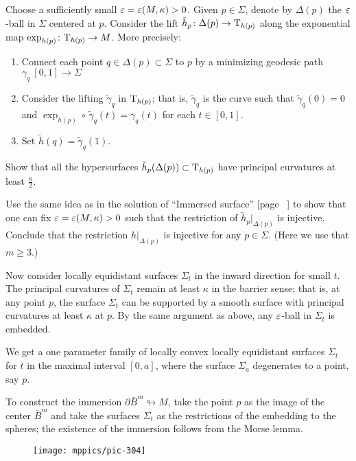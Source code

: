 Choose a sufficiently small $\varepsilon=\varepsilon(M,\kappa)>0$.
Given $p\in \Sigma$, denote by $\Delta(p)$ the $\varepsilon$-ball in $\Sigma$ centered at $p$.
Consider the lift $\tilde h_p\colon\Delta(p)\to \mathrm{T}_{h(p)}$ along the exponential map $\exp_{h(p)}\colon\mathrm{T}_{h(p)}\to M$.
More precisely:
\begin{enumerate}
\item Connect each point $q\in \Delta(p)\subset \Sigma$ to $p$
by a minimizing geodesic  path $\gamma_q\:[0,1]\to \Sigma$
\item Consider the lifting $\tilde\gamma_q$ in $\mathrm{T}_{h(p)}$; 
that is, $\tilde\gamma_q$ is the curve such that $\tilde\gamma_q(0)=0$ 
and $\exp_{h(p)}\circ\,\tilde\gamma_q(t)=\gamma_q(t)$ for each $t\in[0,1]$.
 \item Set $\tilde h(q)=\tilde\gamma_q(1)$.
\end{enumerate}

Show that all the hypersurfaces $\tilde h_p(\Delta(p))\subset \mathrm{T}_{h(p)}$ have principal curvatures at least $\tfrac\kappa2$.

Use the same idea as in the solution of ``Immersed surface'' [page ~\pageref{Immersed surface}] to show that 
one can fix $\eps\z=\eps(M,\kappa)>0$ such that the restriction of $\tilde h_p|_{\Delta(p)}$ is injective.
Conclude that the restriction $h|_{\Delta(p)}$ is injective for any $p\in\Sigma$.
(Here we use that $m\ge 3$.)

Now consider locally equidistant surfaces $\Sigma_t$ in the inward direction for small $t$. 
The principal curvatures of $\Sigma_t$ remain at least $\kappa$ in the barrier sense;
that is, at any point $p$, the surface $\Sigma_t$ can be supported by a smooth surface with principal curvatures at least $\kappa$ at $p$.
By the same argument as above, any $\varepsilon$-ball in $\Sigma_t$ is embedded.

We get a one parameter family of locally convex locally equidistant surfaces $\Sigma_t$
for $t$ in the maximal interval $[0,a]$,
where the surface $\Sigma_a$ degenerates to a point, say $p$. 

To construct the immersion $\partial \bar B^m\looparrowright M$,
take the point $p$ as the image of the center $\bar B^m$ 
and take the surfaces $\Sigma_t$ as the restrictions of the  embedding to the spheres;
the existence of the immersion follows from the Morse lemma.\qeds

\begin{wrapfigure}{r}{30 mm}
\vskip0mm
\centering
\texttt{[image: mppics/pic-304]}
\end{wrapfigure}


